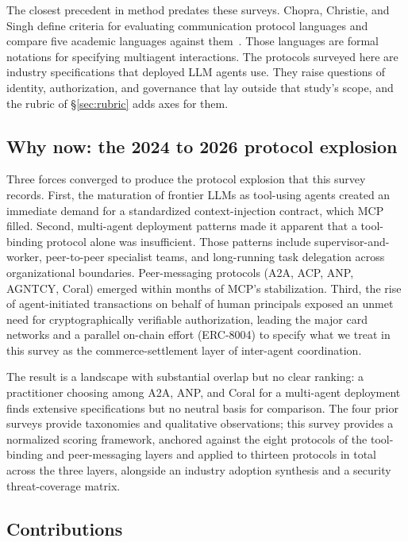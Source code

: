 The closest precedent in method predates these surveys. Chopra,
Christie, and Singh define criteria for evaluating communication
protocol languages and compare five academic languages against
them~\cite{chopra2020protocol}. Those languages are formal notations
for specifying multiagent interactions. The protocols surveyed here
are industry specifications that deployed LLM agents use. They raise
questions of identity, authorization, and governance that lay outside
that study's scope, and the rubric of \S\ref{sec:rubric} adds axes
for them.

\subsection{Why now: the 2024 to 2026 protocol explosion}
\label{sec:intro:whynow}

Three forces converged to produce the protocol explosion that this
survey records. First, the maturation of frontier LLMs as tool-using
agents created an immediate demand for a standardized
context-injection contract, which MCP filled. Second, multi-agent
deployment patterns made it apparent that a tool-binding protocol
alone was insufficient. Those patterns include supervisor-and-worker,
peer-to-peer specialist teams, and long-running task delegation
across organizational boundaries. Peer-messaging protocols (A2A,
ACP, ANP, AGNTCY, Coral) emerged within months of MCP's
stabilization. Third, the
rise of agent-initiated transactions on behalf of human principals
exposed an unmet need for cryptographically verifiable
authorization, leading the major card networks and a parallel
on-chain effort (ERC-8004) to specify what we treat in this survey
as the commerce-settlement layer of inter-agent coordination.

The result is a landscape with substantial overlap but no clear
ranking: a practitioner choosing among A2A, ANP, and Coral for a
multi-agent deployment finds extensive specifications but no
neutral basis for comparison. The four prior surveys provide
taxonomies and qualitative observations; this survey provides a
normalized scoring framework, anchored against the eight
protocols of the tool-binding and peer-messaging layers and
applied to thirteen protocols in total across the three layers,
alongside an industry
adoption synthesis and a security threat-coverage matrix.

\subsection{Contributions}
\label{sec:intro:contributions}

